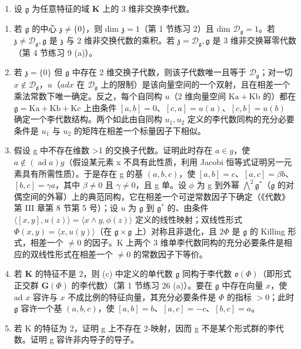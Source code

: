 \begin{enumerate}
\def\labelenumi{\arabic{enumi}.}
\setcounter{enumi}{22}
\tightlist
\item
  设 \(\mathfrak{g}\) 为任意特征的域 \(\mathbf{K}\) 上的 3 维非交换李代数。
\end{enumerate}

\begin{enumerate}
\def\labelenumi{(\alph{enumi})}
\item
  若 \(\mathfrak{g}\) 的中心 \(\mathfrak{z} \neq \{0\}\)，则 dim \(\mathfrak{z} = 1\)（第 1 节练习 2）且 dim \(\mathcal{D}_{\mathfrak{g}} = 1\)。若 \(\mathfrak{z} \neq \mathcal{D}_{\mathfrak{g}}, \mathfrak{g}\) 是 \(\mathfrak{z}\) 与 2 维非交换代数的乘积。若 \(\mathfrak{z} = \mathcal{D}_{\mathfrak{g}}, \mathfrak{g}\) 是 3 维非交换幂零代数（第 4 节练习 9 (a)）。
\item
  若 \(\mathfrak{z} = \{0\}\) 但 \(\mathfrak{g}\) 中存在 2 维交换子代数，则该子代数唯一且等于 \(\mathcal{D}_{\mathfrak{g}}\)；对一切 \(x \notin \mathcal{D}_{\mathfrak{g}}\)，\(u\)（\(ad x\) 在 \(\mathcal{D}_{\mathfrak{g}}\) 上的限制）是该向量空间的一个双射，且在相差一个乘法常数下唯一确定。反之，每个自同构 \(u\)（2 维向量空间 \(\mathrm{Ka} + \mathrm{Kb}\) 的）都在 \(\mathfrak{g} = \mathrm{Ka} + \mathrm{Kb} + \mathrm{Kc}\) 上由条件 \([a, b] = 0\)、\([c, a] = u(a)\)、\([c, b] = u(b)\) 确定一个李代数结构。两个如此由自同构 \(u_1, u_2\) 定义的李代数同构的充分必要条件是 \(u_1\) 与 \(u_2\) 的矩阵在相差一个标量因子下相似。
\item
  假设 g 中不存在维数 \textgreater1 的交换子代数。证明此时存在 \(a \in g\)，使 \(a \notin (\operatorname{ad} a)g\)（假设某元素 x 不具有此性质，利用 Jacobi 恒等式证明另一元素具有所需性质）。于是存在 g 的基 \((a, b, c)\)，使 \([a, b] = c\)、\([a, c] = \beta b\)、\([b, c] = \gamma a\)，其中 \(\beta \neq 0\) 且 \(\gamma \neq 0\)，且 g 单。设 \(\phi\) 为 g 到外幂 \(\bigwedge^{2}\mathfrak{g}^{*}\)（\(\mathfrak{g}\) 的对偶空间的外幂）上的典范同构，它在相差一个可逆常数因子下确定（《代数》第 III 章第 8 节第 5 号）；设 \(u\) 为 \(\mathfrak{g}\) 到 \(\mathfrak{g}^{*}\) 的、由条件 \(\langle [x,y],u(z)\rangle = \langle x\wedge y,\phi (z)\rangle\) 定义的线性映射；双线性形式 \(\Phi (x,y) = \langle x,u(y)\rangle\)（在 \(\mathfrak{g}\times \mathfrak{g}\) 上）对称且非退化，且 \(2\Phi\) 是 \(\mathfrak{g}\) 的 Killing 形式，相差一个 \(\neq 0\) 的因子。K 上两个 3 维单李代数同构的充分必要条件是相应的双线性形式在相差一个 \(\neq 0\) 的常数因子下等价。
\item
  若 \(\mathbf{K}\) 的特征不是 2，则 (c) 中定义的单代数 \(\mathfrak{g}\) 同构于李代数 \(\mathfrak{o}(\Phi)\)（即形式正交群 \(\mathbf{G}(\Phi)\) 的李代数）（第 1 节练习 26 (a)）。要在 \(\mathfrak{g}\) 中存在向量 \(x\)，使 ad \(x\) 容许与 \(x\) 不成比例的特征向量，其充分必要条件是 \(\Phi\) 的指标 \(>0\)；此时 \(\mathfrak{g}\) 容许一个基 \((a, b, c)\)，使 \([a, b] = b\)、\([a, c] = -c\)、\([b, c] = a\)。
\item
  若 K 的特征为 2，证明 g 上不存在 2-映射，因而 g 不是某个形式群的李代数。证明 g 容许非内导子的导子。
\end{enumerate}

